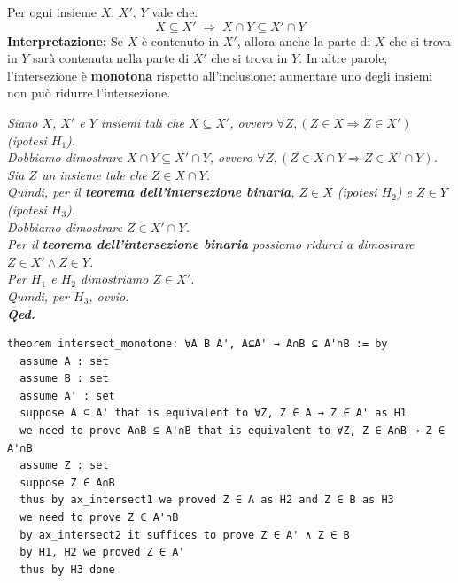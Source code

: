 \documentclass[
  a4paper,
]{article}
\begin{document}
Per ogni insieme \(X\), \(X'\), \(Y\) vale che: \[
X \subseteq X' \;\Rightarrow\; X \cap Y \subseteq X' \cap Y
\] \textbf{Interpretazione:} Se \(X\) è contenuto in \(X'\), allora
anche la parte di \(X\) che si trova in \(Y\) sarà contenuta nella parte
di \(X'\) che si trova in \(Y\). In altre parole, l'intersezione è
\textbf{monotona} rispetto all'inclusione: aumentare uno degli insiemi
non può ridurre l'intersezione.

\begin{examplebox}[Dimostrazione]

\emph{Siano \(X\), \(X'\) e \(Y\) insiemi tali che \(X \subseteq X'\),
ovvero \(\forall Z , (Z \in X \Rightarrow Z \in X')\) (ipotesi
\(H_1\)).}\\
\emph{Dobbiamo dimostrare \(X \cap Y \subseteq X' \cap Y\), ovvero
\(\forall Z , (Z \in X \cap Y \Rightarrow Z \in X' \cap Y)\).}\\
\emph{Sia \(Z\) un insieme tale che \(Z \in X \cap Y\).}\\
\emph{Quindi, per il \textbf{teorema dell'intersezione binaria},
\(Z \in X\) (ipotesi \(H_2\)) e \(Z \in Y\) (ipotesi \(H_3\)).}\\
\emph{Dobbiamo dimostrare \(Z \in X' \cap Y\).}\\
\emph{Per il \textbf{teorema dell'intersezione binaria} possiamo ridurci
a dimostrare \(Z \in X' \land Z \in Y\).}\\
\emph{Per \(H_1\) e \(H_2\) dimostriamo \(Z \in X'\).}\\
\emph{Quindi, per \(H_3\), ovvio.}\\
\textbf{\emph{Qed.}}

\end{examplebox}

\begin{examplebox}

\begin{lstlisting}
theorem intersect_monotone: ∀A B A', A⊆A' → A∩B ⊆ A'∩B := by
  assume A : set
  assume B : set
  assume A' : set
  suppose A ⊆ A' that is equivalent to ∀Z, Z ∈ A → Z ∈ A' as H1
  we need to prove A∩B ⊆ A'∩B that is equivalent to ∀Z, Z ∈ A∩B → Z ∈ A'∩B
  assume Z : set 
  suppose Z ∈ A∩B
  thus by ax_intersect1 we proved Z ∈ A as H2 and Z ∈ B as H3
  we need to prove Z ∈ A'∩B
  by ax_intersect2 it suffices to prove Z ∈ A' ∧ Z ∈ B
  by H1, H2 we proved Z ∈ A'
  thus by H3 done
\end{lstlisting}

\end{examplebox}
\end{document}
